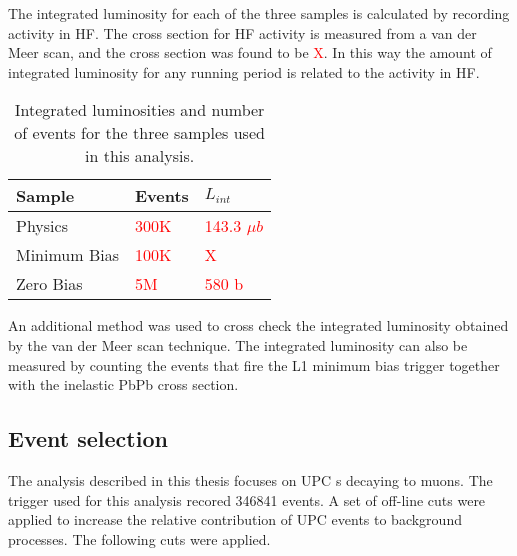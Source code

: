       The integrated luminosity for each of the three samples is calculated
        by recording activity in HF. 
      The cross section for HF activity is measured from a van der Meer scan, 
        and the cross section was found to be \textcolor{red}{X}.
      In this way the amount of integrated luminosity for any running period is
        related to the activity in HF. 
      \begin{table}
  	    \centering
  	    \begin{tabular}{|l|l|l|}
  	      \hline Sample & Events & $L_{int}$ \\ \hline \hline
  	      Physics & \textcolor{red}{300K} & \textcolor{red}{143.3 
  	        $\mu$$b$} \\ \hline
  	      Minimum Bias & \textcolor{red}{100K} & \textcolor{red}{X} \\ \hline
  	      Zero Bias & \textcolor{red}{5M} & \textcolor{red}{580 b} \\ \hline \hline
  	    \end{tabular}
  	    \caption{Integrated luminosities and number of events for the three
  	      samples used in this analysis.}
  	    \label{tab:sampleLumiNevt}
      \end{table}
      An additional method was used to cross check the integrated luminosity 
        obtained by the van der Meer scan technique.
      The integrated luminosity can also be measured by counting the events that
        fire the L1 minimum bias trigger together with the inelastic PbPb cross 
        section. 

    \subsection{Event selection}
      The analysis described in this thesis focuses on UPC \DIFdelbegin {}\DIFdelend \DIFaddbegin {}\DIFaddend s decaying to 
        muons. 
      The trigger used for this analysis recored 346841 events.
      A set of off-line cuts were applied to increase the relative contribution 
        of UPC events to background processes. 
      The following cuts were applied. 

